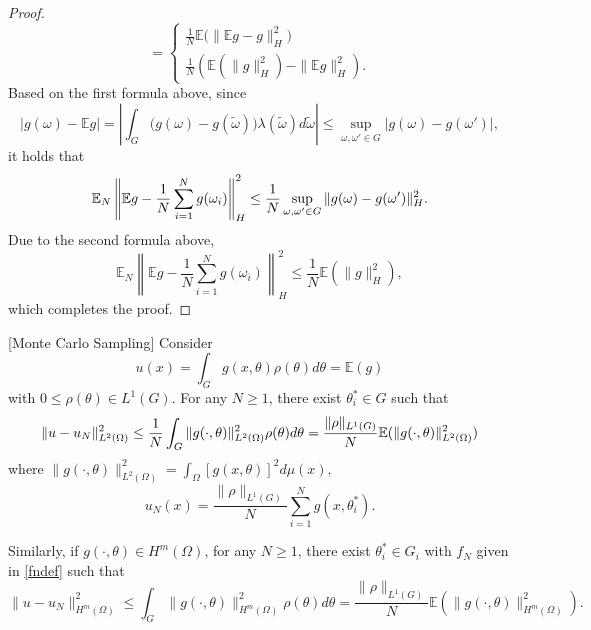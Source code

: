\begin{proof}
\begin{equation}
      =
           \left\{
             \begin{aligned}
            \frac{1}{N}\mathbb{E}\big (\|\mathbb{E} g-g\|_H^2\big )\\
            \frac{1}{N}(\mathbb{E}(\|g\|_H^2) - \|\mathbb{E} g\|_H^2).
            \end{aligned}
    \right.
  \end{equation}
Based on the first formula above, since
$$
|g(\omega) - \mathbb{E} g|=|\int_G \big (g(\omega) - g(\tilde \omega) \big )\lambda(\tilde \omega)d\tilde \omega|\le \sup_{\omega, \omega'\in G} |g(\omega) - g(\omega')|,
$$
it holds that
 \begin{equation} 
 \mathbb{E}_N\left\|\mathbb{E} g-
      {1\over N }\sum_{i=1}^Ng(\omega_i)\right\|_H^2 
            \le\frac{1}{N} \sup_{\omega, \omega'\in G} \|g(\omega) - g(\omega')\|_H^2.
  \end{equation}
Due to the second formula above,  
 \begin{equation}
    \label{eqn}
 \mathbb{E}_N\left\|\mathbb{E} g-
      \frac1N\sum_{i=1}^Ng(\omega_i)\right\|_H^2  
            \le\frac{1}{N} \mathbb E(\|g\|_H^2),
  \end{equation}
which completes the proof.
\end{proof}


%
\begin{lemma}\label{lem:sample}
\textup{[Monte Carlo Sampling]}
	Consider 
	\begin{equation}
	\label{uv}
	u(x)=\int_{G}g(x,\theta)\rho(\theta)d\theta   = \mathbb E (g)
	\end{equation}
	with $0\le \rho(\theta)\in L^1(G)$. For any $N\ge 1$, there exist $\theta_i^*\in G$ such that
	$$
	\|u-u_N\|_{L^2(\Omega)}^2 
	\le\frac{1}{N}
	\int_G \|g(\cdot,\theta)\|_{L^2(\Omega)}^2\rho(\theta)d\theta = {\|\rho\|_{L^1(G)}\over N}\mathbb E (\|g(\cdot,\theta)\|_{L^2(\Omega)}^2)
	$$
	where  
	$
	\|g(\cdot,\theta)\|_{L^2(\Omega)}^2 = \int_{\Omega} [g(x,\theta)]^2 d\mu(x),
	$
	\begin{equation}\label{fndef} 
	u_N(x)=\frac{\|\rho\|_{L^1(G)}}{N}\sum_{i=1}^N g(x,\theta_i^*).
	\end{equation}

Similarly, if $g(\cdot, \theta)\in H^m(\Omega)$, for any $N\ge 1$, there exist $\theta_i^*\in G_i$ with $f_N$ given in \eqref{fndef} such that
	\begin{equation}\label{eq:hm}
	\|u-u_N\|_{H^m(\Omega)}^2 
	\le 
	\int_G  \|g(\cdot,\theta)\|_{H^m(\Omega)}^2\rho(\theta)d\theta
	=\frac{\|\rho\|_{L^1(G)}}{N} \mathbb E (\|g(\cdot,\theta)\|_{H^m(\Omega)}^2).
	\end{equation}
\end{lemma}

